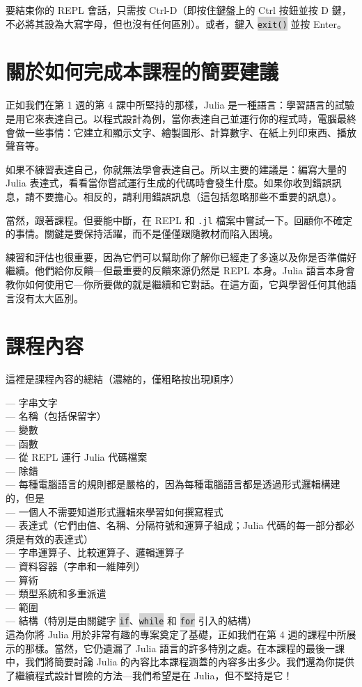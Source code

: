 \documentclass[]{article}
\newcommand{\codequote}[1]{\colorbox{lightgray}{\tt #1}}
\begin{document}
要結束你的 REPL 會話，只需按 Ctrl-D（即按住鍵盤上的 Ctrl 按鈕並按 D 鍵，不必將其設為大寫字母，但也沒有任何區別）。或者，鍵入 \codequote{exit()} 並按 Enter。

\section*{關於如何完成本課程的簡要建議}

正如我們在第 1 週的第 4 課中所堅持的那樣，Julia 是一種語言：學習語言的試驗是用它來表達自己。以程式設計為例，當你表達自己並運行你的程式時，電腦最終會做一些事情：它建立和顯示文字、繪製圖形、計算數字、在紙上列印東西、播放聲音等。

如果不練習表達自己，你就無法學會表達自己。所以主要的建議是：編寫大量的 Julia 表達式，看看當你嘗試運行生成的代碼時會發生什麼。如果你收到錯誤訊息，請不要擔心。相反的，請利用錯誤訊息（這包括忽略那些不重要的訊息）。

當然，跟著課程。但要能中斷，在 REPL 和 {\tt .jl} 檔案中嘗試一下。回顧你不確定的事情。關鍵是要保持活躍，而不是僅僅跟隨教材而陷入困境。

練習和評估也很重要，因為它們可以幫助你了解你已經走了多遠以及你是否準備好繼續。他們給你反饋---但最重要的反饋來源仍然是 REPL 本身。Julia 語言本身會教你如何使用它---你所要做的就是繼續和它對話。在這方面，它與學習任何其他語言沒有太大區別。

\section*{課程內容}
這裡是課程內容的總結（濃縮的，僅粗略按出現順序）

--- 字串文字\\
--- 名稱（包括保留字）\\
--- 變數 \\
--- 函數 \\
--- 從 REPL 運行 Julia 代碼檔案 \\
--- 除錯 \\
--- 每種電腦語言的規則都是嚴格的，因為每種電腦語言都是透過形式邏輯構建的，但是 \\
--- 一個人不需要知道形式邏輯來學習如何撰寫程式 \\
--- 表達式（它們由值、名稱、分隔符號和運算子組成；Julia 代碼的每一部分都必須是有效的表達式）\\
--- 字串運算子、比較運算子、邏輯運算子 \\
--- 資料容器（字串和一維陣列）\\
--- 算術 \\
--- 類型系統和多重派遣 \\
--- 範圍 \\
--- 結構（特別是由關鍵字 \codequote{if}、\codequote{while} 和 \codequote{for} 引入的結構）\\

這為你將 Julia 用於非常有趣的專案奠定了基礎，正如我們在第 4 週的課程中所展示的那樣。當然，它仍遺漏了 Julia 語言的許多特別之處。在本課程的最後一課中，我們將簡要討論 Julia 的內容比本課程涵蓋的內容多出多少。我們還為你提供了繼續程式設計冒險的方法---我們希望是在 Julia，但不堅持是它！
\end{document}
